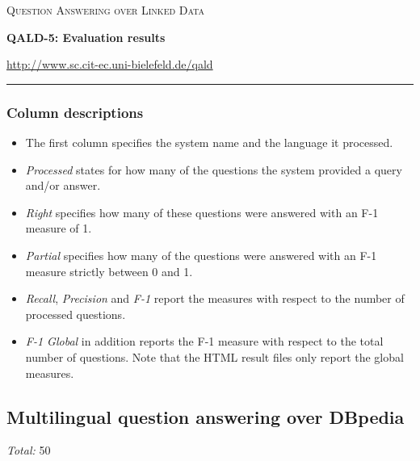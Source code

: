 \documentclass{article}
\begin{document}
\thispagestyle{empty}

\begin{center}
\textsc{\large Question Answering over Linked Data}

\vspace{.2cm}

\textbf{\huge QALD-5: Evaluation results}

\vspace{.4cm}

\url{http://www.sc.cit-ec.uni-bielefeld.de/qald}

\end{center}

\vspace{.2cm}

\hrule 


\subsubsection*{Column descriptions} 

\begin{itemize}
\item The first column specifies the system name and the language it processed.
\item \emph{Processed} states for how many of the questions the system provided a query and/or answer. 
\item \emph{Right} specifies how many of these questions were answered with an F-1 measure of 1. 
\item \emph{Partial} specifies how many of the questions were answered with an F-1 measure strictly between 0 and 1.
\item \emph{Recall}, \emph{Precision} and \emph{F-1} report the measures with respect to the number of processed questions. 
\item \emph{F-1 Global} in addition reports the F-1 measure with respect to the total number of questions. 
Note that the HTML result files only report the global measures.
\end{itemize}

\subsection*{Multilingual question answering over DBpedia}

\emph{Total:} 50

\vspace{.6cm}
\end{document}
